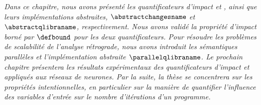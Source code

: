\frenchdiv

\emph{Dans ce chapitre, nous avons présenté les quantificateurs d'impact \changesname{} et \qlibraname{}, ainsi que leurs implémentations abstraites, $\abstractchangesname$ et $\abstractqlibraname$, respectivement. Nous avons validé la propriété d'impact borné par $\defbound$ pour les deux quantificateurs. Pour résoudre les problèmes de scalabilité de l'analyse rétrograde, nous avons introduit les sémantiques parallèles et l'implémentation abstraite $\parallelqlibraname$. Le prochain chapitre présentera les résultats expérimentaux des quantificateurs d'impact \changesname{} et \qlibraname{} appliqués aux réseaux de neurones. Par la suite, la thèse se concentrera sur les propriétés intentionnelles, en particulier sur la manière de quantifier l'influence des variables d'entrée sur le nombre d'itérations d'un programme.}
